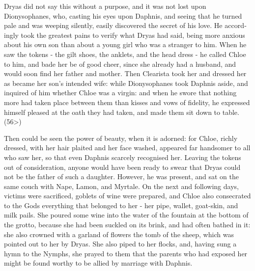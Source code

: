 \documentclass{book}
\begin{document}
\begin{pairs}
\begin{Rightside}
\begin{english}
  Dryas did not say this without a purpose, and it was not lost upon Dionysophanes, who, casting his eyes upon Daphnis, and seeing that he turned pale and was weeping silently, easily discovered the secret of his love.  He accordingly took the greatest pains to verify what Dryas had said, being more anxious about his own son than about a young girl who was a stranger to him.  When he saw the tokens - the gilt shoes, the anklets, and the head dress - he called Chloe to him, and bade her be of good cheer, since she already had a husband, and would soon find her father and mother.  Then Clearista took her and dressed her as became her son's intended wife: while Dionysophanes took Daphnis aside, and inquired of him whether Chloe was a virgin: and when he swore that nothing more had taken place between them than kisses and vows of fidelity, he expressed himself pleased at the oath they had taken, and made them sit down to table.  (56>)
\pend


  Then could be seen the power of beauty, when it is adorned: for Chloe, richly dressed, with her hair plaited and her face washed, appeared far handsomer to all who saw her, so that even Daphnis scarcely recognised her.  Leaving the tokens out of consideration, anyone would have been ready to swear that Dryas could not be the father of such a daughter.  However, he was present, and sat on the same couch with Nape, Lamon, and Myrtale.  On the next and following days, victims were sacrificed, goblets of wine were prepared, and Chloe also consecrated to the Gods everything that belonged to her - her pipe, wallet, goat-skin, and milk pails.  She poured some wine into the water of the fountain at the bottom of the grotto, because she had been suckled on its brink, and had often bathed in it: she also crowned with a garland of flowers the tomb of the sheep, which was pointed out to her by Dryas.  She also piped to her flocks, and, having sung a hymn to the Nymphs, she prayed to them that the parents who had exposed her might be found worthy to be allied by marriage with Daphnis.
\pend



\end{english}
\end{Rightside}
\end{pairs}
\end{document}
